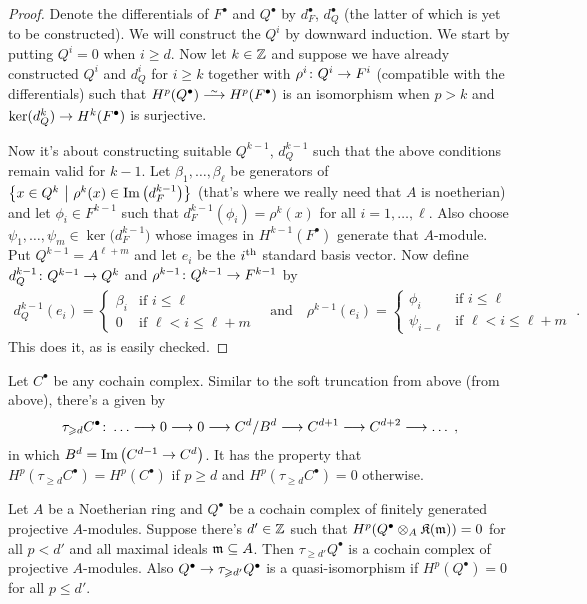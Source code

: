 \documentclass[a4paper,parskip=half,numbers=enddot, DIV=12]{scrreprt}
\renewcommand{\geq}{\geqslant}
\renewcommand{\leq}{\leqslant}
\begin{document}
\begin{proof}
	Denote the differentials of $F^\bullet$ and $Q^\bullet$ by $d_F^\bullet$, $d_Q^\bullet$ (the latter of which is yet to be constructed). We will construct the $Q^i$ by downward induction. We start by putting $Q^i=0$ when $i\geq d$. Now let $k\in\mathbb{Z}$ and suppose we have already constructed $Q^i$ and $d_Q^i$ for $i\geq k$ together with $\rho^i\colon Q^i\morphism F^i$ (compatible with the differentials) such that $H^p(Q^\bullet)\isomorphism H^p(F^\bullet)$ is an isomorphism when $p>k$ and $\ker(d_Q^k)\morphism H^k(F^\bullet)$ is surjective.
	
Now it's about constructing suitable $Q^{k-1}$, $d_Q^{k-1}$ such that the above conditions remain valid for $k-1$. Let $\beta_1,\ldots,\beta_\ell$ be generators of $\left\{x\in Q^k\ \middle|\  \rho^k(x)\in\operatorname{Im}\big(d_F^{k-1}\big)\right\}$
(that's where we really need that $A$ is noetherian) and let $\phi_i\in F^{k-1}$ such that $d_F^{k-1}(\phi_i)=\rho^k(x)$ for all $i=1,\ldots,\ell$. Also choose $\psi_1,\ldots,\psi_m\in\ker\big(d_F^{k-1}\big)$ whose images in $H^{k-1}(F^\bullet)$ generate that $A$-module. Put $Q^{k-1}=A^{\ell+m}$ and let $e_i$ be the $i^{\text{th}}$ standard basis vector. Now define $d_Q^{k-1}\colon Q^{k-1}\morphism Q^k$ and $\rho^{k-1}\colon Q^{k-1}\morphism F^{k-1}$ by
\begin{align*}
	d_Q^{k-1}(e_i)=
	\begin{cases}
		\beta_i &\text{if }i\leq \ell\\
		0 & \text{if }\ell <i\leq \ell+m
	\end{cases}\quad\text{and}\quad\rho^{k-1}(e_i)=
	\begin{cases}
		\phi_i & \text{if }i\leq \ell\\
		\psi_{i-\ell} & \text{if }\ell <i\leq \ell+m
	\end{cases}\;.
\end{align*}
This does it, as is easily checked.
\end{proof}
Let $C^\bullet$ be any cochain complex. Similar to the soft truncation from above (from above), there's a  given by
\begin{align*}
\tau_{\geq d}C^\bullet\colon\ldots\morphism 0\morphism 0\morphism C^d/B^d\morphism C^{d+1}\morphism C^{d+2}\morphism \ldots\;,
\end{align*}
in which $B^d=\Im\left(C^{d-1}\morphism C^d\right)$. It has the property that $H^p(\tau_{\geq d}C^\bullet)=H^p(C^\bullet)$ if $p\geq d$ and $H^p(\tau_{\geq d}C^\bullet)=0$ otherwise.
\begin{lem}
	Let $A$ be a Noetherian ring and $Q^\bullet$ be a cochain complex of finitely generated projective $A$-modules. Suppose there's $d'\in\mathbb{Z}$ such that $H^p(Q^\bullet\otimes_A\mathfrak{K}(\mathfrak{m}))=0$ for all $p<d'$ and all maximal ideals $\mathfrak{m}\subseteq A$. Then $\tau_{\geq d'}Q^\bullet$ is a cochain complex of projective $A$-modules. Also $Q^\bullet\morphism \tau_{\geq d'}Q^\bullet$ is a quasi-isomorphism if $H^p(Q^\bullet)=0$ for all $p\leq d'$.
\end{lem}
\end{document}
